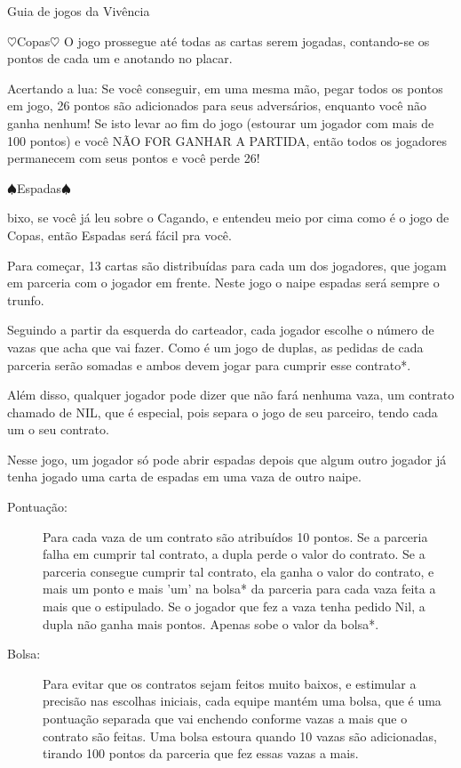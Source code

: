 \begin{secao}{Guia de jogos da Vivência }
\begin{subsecao}{$\heartsuit$Copas$\heartsuit$}
O jogo prossegue até todas as cartas serem jogadas, contando-se os pontos de cada um e anotando no placar. 

Acertando a lua: Se você conseguir, em uma mesma mão, pegar todos os pontos em jogo, 26 pontos são adicionados para seus adversários, enquanto você não ganha nenhum! Se isto levar ao fim do jogo (estourar um jogador com mais de 100 pontos) e você NÃO FOR GANHAR A PARTIDA, então todos os jogadores permanecem com seus pontos e você perde 26! 

\end{subsecao}


\begin{subsecao}{$\spadesuit$Espadas$\spadesuit$} 


bixo, se você já leu sobre o Cagando, e entendeu meio por cima como é o jogo de Copas, então Espadas será fácil pra você. 

Para começar, 13 cartas são distribuídas para cada um dos jogadores, que jogam em parceria com o jogador em frente. Neste jogo o naipe espadas será sempre o trunfo.

Seguindo a partir da esquerda do carteador, cada jogador escolhe o número de vazas que acha que vai fazer. Como é um jogo de duplas, as pedidas de cada parceria serão somadas e ambos devem jogar para cumprir esse contrato*. 

Além disso, qualquer jogador pode dizer que não fará nenhuma vaza, um contrato chamado de NIL, que é especial, pois separa o jogo de seu parceiro, tendo cada um o seu contrato.

Nesse jogo, um jogador só pode abrir espadas depois que algum outro jogador já tenha jogado uma carta de espadas em uma vaza de outro naipe.
\begin{description}

\item[Pontuação:]

Para cada vaza de um contrato são atribuídos 10 pontos. Se a parceria falha em cumprir tal contrato, a dupla perde o valor do contrato. Se a parceria consegue cumprir tal contrato, ela ganha o valor do contrato, e mais um ponto e mais 'um' na bolsa* da parceria para cada vaza feita a mais que o estipulado. Se o jogador que fez a vaza tenha pedido Nil, a dupla não ganha mais pontos. Apenas sobe o valor da bolsa*.

\item[Bolsa:]

Para evitar que os contratos sejam feitos muito baixos, e estimular a precisão nas escolhas iniciais, cada equipe mantém uma bolsa, que é uma pontuação separada que vai enchendo conforme vazas a mais que o contrato são feitas. Uma bolsa estoura quando 10 vazas são adicionadas, tirando 100 pontos da parceria que fez essas vazas a mais.


\end{description}
\end{subsecao}
\end{secao}
